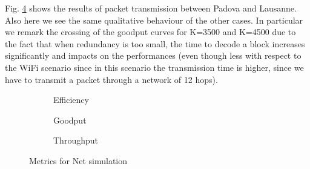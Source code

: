 Fig. \ref{fig:net} shows the results of packet transmission between Padova and Lausanne. Also here we see the same qualitative behaviour of the other cases. In particular we remark the crossing of the goodput curves for K=3500 and K=4500 due to the fact that when redundancy is too small, the time to decode a block increases significantly and impacts on the performances (even though less with respect to the WiFi scenario since in this scenario the transmission time is higher, since we have to transmit a packet through a network of 12 hops).
\begin{figure}[!hp]
\centering
\begin{subfigure}{0.23\textwidth}
	\captionsetup{justification=centering,font=scriptsize}
	\centering
	\setlength\fwidth{\textwidth}
	\setlength{}
	
	\caption{Efficiency}
	\label{fig:net_eff}
\end{subfigure}\hspace{2em}%
\begin{subfigure}{0.23\textwidth}
	\captionsetup{justification=centering,font=scriptsize}
	\centering
	\setlength\fwidth{\textwidth}
	\setlength{}
	
	\caption{Goodput}
	\label{fig:net_good}
\end{subfigure}\hspace{2em}%
\begin{subfigure}{0.23\textwidth}
	\captionsetup{justification=centering,font=scriptsize}
	\centering
	\setlength\fwidth{\textwidth}
	\setlength{}
	
	\caption{Throughput}
	\label{fig:net_thr}
\end{subfigure}
\caption{Metrics for Net simulation}
\label{fig:net}
\end{figure}

